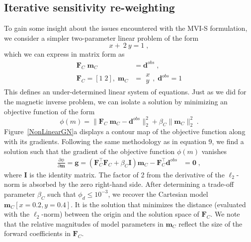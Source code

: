 \documentclass[paper]{geophysics}
\begin{document}
\subsection{Iterative sensitivity re-weighting}
To gain some insight about the issues encountered with the MVI-S formulation, we consider a simpler two-parameter linear problem of the form
\begin{equation}
x + \:2\:y =1 \;,
\end{equation}
which we can express in matrix form as
\begin{equation}\label{twoParam}
\begin{split}
\mathbf{F}_C\;\mathbf{m}_C &= \mathbf{d}^{obs} \;,\\
\mathbf{F}_C = [1\;2], \;
\mathbf{m}_C &=
\begin{matrix}
x\\
y
\end{matrix}, \;
\mathbf{d}^{obs} = 1
\end{split}
\end{equation}
This defines an under-determined linear system of equations. Just as we did for the magnetic inverse problem, we can isolate a solution by minimizing an objective function of the form
\begin{equation}\label{toyProblem}
\phi(m) = \| \mathbf{F}_C\;\mathbf{m}_C - \mathbf{d}^{obs} \|_2^2 + \beta_C \| \mathbf{m}_C \|_2^2 \;.
\end{equation}
Figure~\ref{NonLinearGN}a displays a contour map of the objective function along with its gradients.
Following the same methodology as in equation 9, we find a solution such that the gradient of the objective function $\phi(m)$ vanishes
\begin{equation}\label{gradLinear}
\begin{split}
\frac{\partial \phi}{\partial \mathbf{m}}=\mathbf{g} = \left(\mathbf{F}_C^\top\mathbf{F}_C + \beta_C \mathbf{I}\right) \mathbf{m}_C - \mathbf{F}_C^\top \mathbf{d}^{obs} &= \mathbf{0}\;,
\end{split}
\end{equation}
where $\mathbf{I}$ is the identity matrix. The factor of 2 from the derivative of the $\ell_2$-norm is absorbed by the zero right-hand side.
After determining a trade-off parameter $\beta_C$ such that $\phi_d \leq 10^{-3}$, we recover the Cartesian model $\mathbf{m}_C[x=0.2, y=0.4]$. It is the solution that minimizes the distance (evaluated with the $\ell_2$-norm) between the origin and the solution space of $\mathbf{F}_C$. We note that the relative magnitudes of model parameters in $\mathbf{m}_C$ reflect the size of the forward coefficients in $\mathbf{F}_C$.
\end{document}
